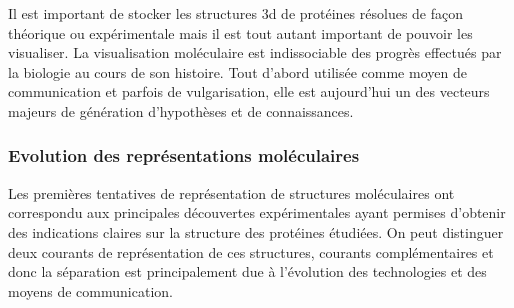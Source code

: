 Il est important de stocker les structures 3d de protéines résolues de façon théorique ou expérimentale mais il est tout autant important de pouvoir les visualiser. La visualisation moléculaire est indissociable des progrès effectués par la biologie au cours de son histoire. Tout d'abord utilisée comme moyen de communication et parfois de vulgarisation, elle est aujourd'hui un des vecteurs majeurs de génération d'hypothèses et de connaissances.

\subsubsection{Evolution des représentations moléculaires}

Les premières tentatives de représentation de structures moléculaires ont correspondu aux principales découvertes expérimentales ayant permises d'obtenir des indications claires sur la structure des protéines étudiées. On peut distinguer deux courants de représentation de ces structures, courants complémentaires et donc la séparation est principalement due à l'évolution des technologies et des moyens de communication.

